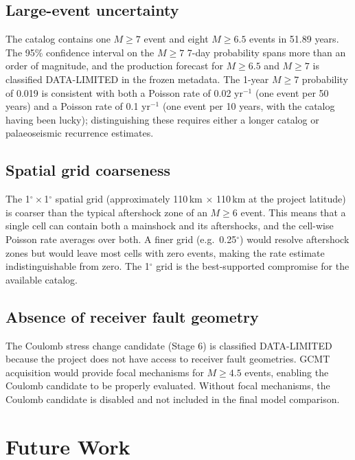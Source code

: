 \documentclass[10pt,a4paper,twocolumn]{article}
\begin{document}
\subsection{Large-event uncertainty}

The catalog contains one $M\geq7$ event and eight $M\geq6.5$ events in 51.89 years. The 95\% confidence interval on the $M\geq7$ 7-day probability spans more than an order of magnitude, and the production forecast for $M\geq6.5$ and $M\geq7$ is classified DATA-LIMITED in the frozen metadata. The 1-year $M\geq7$ probability of 0.019 is consistent with both a Poisson rate of 0.02 yr$^{-1}$ (one event per 50 years) and a Poisson rate of 0.1 yr$^{-1}$ (one event per 10 years, with the catalog having been lucky); distinguishing these requires either a longer catalog or palaeoseismic recurrence estimates.

\subsection{Spatial grid coarseness}

The 1$^\circ\times$1$^\circ$ spatial grid (approximately 110\,km $\times$ 110\,km at the project latitude) is coarser than the typical aftershock zone of an $M\geq6$ event. This means that a single cell can contain both a mainshock and its aftershocks, and the cell-wise Poisson rate averages over both. A finer grid (e.g.\ 0.25$^\circ$) would resolve aftershock zones but would leave most cells with zero events, making the rate estimate indistinguishable from zero. The 1$^\circ$ grid is the best-supported compromise for the available catalog.

\subsection{Absence of receiver fault geometry}

The Coulomb stress change candidate (Stage 6) is classified DATA-LIMITED because the project does not have access to receiver fault geometries. GCMT acquisition would provide focal mechanisms for $M\geq4.5$ events, enabling the Coulomb candidate to be properly evaluated. Without focal mechanisms, the Coulomb candidate is disabled and not included in the final model comparison.

\section{Future Work}\label{sec:future}
\end{document}
